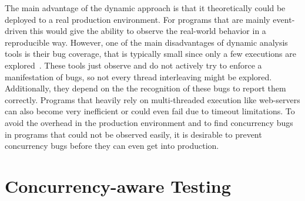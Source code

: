 \documentclass[conference]{IEEEtran}
\begin{document}
The main advantage of the dynamic approach is that it theoretically could be deployed to a real production environment.
For programs that are mainly event-driven this would give the ability to observe the real-world behavior in a reproducible way.
However, one of the main disadvantages of dynamic analysis tools is their bug coverage, that is typically small since only a few executions are explored~\cite{qadeer2004kiss}.
These tools just observe and do not actively try to enforce a manifestation of bugs, so not every thread interleaving might be explored.
Additionally, they depend on the the recognition of these bugs to report them correctly.
Programs that heavily rely on multi-threaded execution like web-servers can also become very inefficient or could even fail due to timeout limitations.
To avoid the overhead in the production environment and to find concurrency bugs in programs that could not be observed easily, it is desirable to prevent concurrency bugs before they can even get into production.


\section{Concurrency-aware Testing}
\label{sct:testing}
\end{document}
